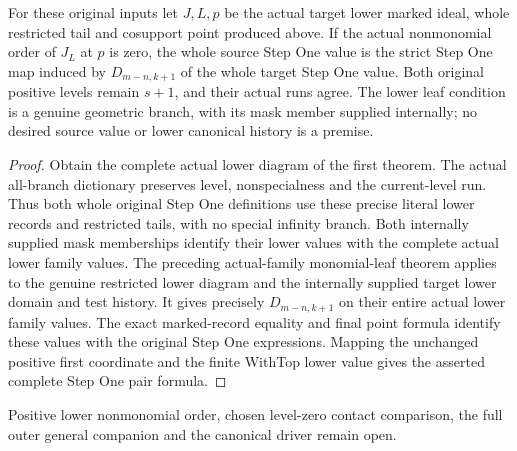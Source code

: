 \begin{theorem}
\label{hir:smooth-original-positive-step-one-monomial-leaf}
\leanok
{}
For these original inputs let $J,L,p$ be the actual target lower marked
ideal, whole restricted tail and cosupport point produced above.
If the actual nonmonomial order of $J_L$ at $p$ is zero, the whole source
Step One value is the strict Step One map induced by $D_{m-n,k+1}$ of
the whole target Step One value.  Both original positive levels remain
$s+1$, and their actual runs agree.  The lower leaf condition is a genuine
geometric branch, with its mask member supplied internally; no desired
source value or lower canonical history is a premise.
\end{theorem}
\begin{proof}
Obtain the complete actual lower diagram of the first theorem.
The actual all-branch dictionary preserves level, nonspecialness and
the current-level run.  Thus both whole original Step One definitions
use these precise literal lower records and restricted tails, with no
special infinity branch.  Both internally supplied mask memberships
identify their lower values with the complete actual lower family values.
The preceding actual-family monomial-leaf theorem applies to the genuine
restricted lower diagram and the internally supplied target lower domain
and test history.  It gives precisely $D_{m-n,k+1}$ on their entire
actual lower family values.  The exact marked-record equality and final
point formula identify these values with the original Step One expressions.
Mapping the unchanged positive first coordinate and the finite WithTop
lower value gives the asserted complete Step One pair formula.
\end{proof}

Positive lower nonmonomial order, chosen level-zero contact comparison,
the full outer general companion and the canonical driver remain open.
